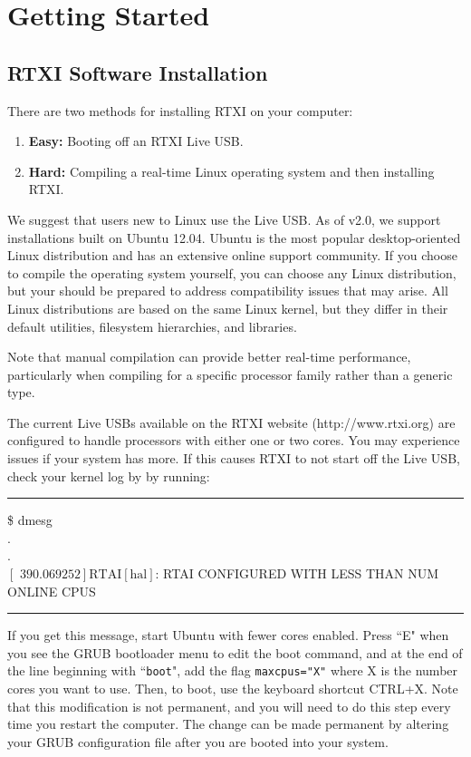 \chapter{Getting Started}

\section{RTXI Software Installation}
There are two methods for installing RTXI on your computer:
\begin{enumerate}
\item \textbf{Easy:} Booting off an RTXI Live USB.
\item \textbf{Hard:} Compiling a real-time Linux operating system and then installing RTXI.
\end{enumerate}


We suggest that users new to Linux use the Live USB. As of v2.0, we support installations built on Ubuntu 12.04. Ubuntu is the most popular desktop-oriented Linux distribution and has an extensive online support community. If you choose to compile the operating system yourself, you can choose any Linux distribution, but your should be prepared to address compatibility issues that may arise. All Linux distributions are based on the same Linux kernel, but they differ in their default utilities, filesystem hierarchies, and libraries. 

Note that manual compilation can provide better real-time performance, particularly when compiling for a specific processor family rather than a generic type. 

\attention
The current Live USBs available on the RTXI website (http://www.rtxi.org) are configured to handle processors with either one or two cores. You may experience issues if your system has more. If this causes RTXI to not start off the Live USB, check your kernel log by by running:
\bigskip
\begin{example}
\hrule\bigskip
\$ dmesg\\
.\\
.\\
$\left[\textrm{ 390.069252}\right] \textrm{RTAI}\left[\textrm{hal}\right]$: RTAI CONFIGURED WITH LESS THAN NUM ONLINE CPUS
\bigskip
\hrule\bigskip
\end{example}

If you get this message, start Ubuntu with fewer cores enabled. Press ``E" when you see the GRUB bootloader menu to edit the boot command, and at the end of the line beginning with ``\texttt{boot}", add the flag \texttt{maxcpus="X"} where X is the number cores you want to use. Then, to boot, use the keyboard shortcut CTRL+X. Note that this modification is not permanent, and you will need to do this step every time you restart the computer. The change can be made permanent by altering your GRUB configuration file after you are booted into your system. 
